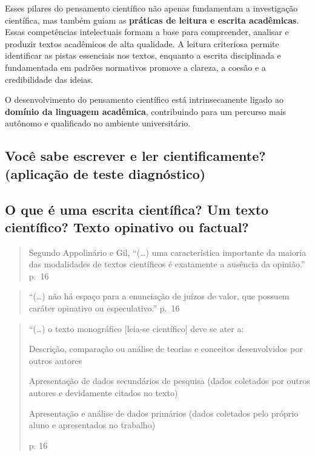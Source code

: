 \documentclass[
  letterpaper,
  DIV=11,
  numbers=noendperiod]{scrreprt}
\begin{document}
Esses pilares do pensamento científico não apenas fundamentam a
investigação científica, mas também guiam as \textbf{práticas de leitura
e escrita acadêmicas}. Essas competências intelectuais formam a base
para compreender, analisar e produzir textos acadêmicos de alta
qualidade. A leitura criteriosa permite identificar as pistas essenciais
nos textos, enquanto a escrita disciplinada e fundamentada em padrões
normativos promove a clareza, a coesão e a credibilidade das ideias.

O desenvolvimento do pensamento científico está intrinsecamente ligado
ao \textbf{domínio da linguagem acadêmica}, contribuindo para um
percurso mais autônomo e qualificado no ambiente universitário.

\subsection{Você sabe escrever e ler cientificamente? (aplicação de
teste
diagnóstico)}\label{vocuxea-sabe-escrever-e-ler-cientificamente-aplicauxe7uxe3o-de-teste-diagnuxf3stico}

\subsection{O que é uma escrita científica? Um texto científico? Texto
opinativo ou
factual?}\label{o-que-uxe9-uma-escrita-cientuxedfica-um-texto-cientuxedfico-texto-opinativo-ou-factual}

\begin{quote}
Segundo Appolinário e Gil, ``(\ldots) uma característica importante da
maioria das modalidades de textos científicos é exatamente a ausência da
opinião.'' p.~16
\end{quote}

\begin{quote}
``(\ldots) não há espaço para a enunciação de juízos de valor, que
possuem caráter opinativo ou especulativo.'' p.~16
\end{quote}

\begin{quote}
``(\ldots) o texto monográfico {[}leia-se científico{]} deve se ater a:

Descrição, comparação ou análise de teorias e conceitos desenvolvidos
por outros autores

Apresentação de dados secundários de pesquisa (dados coletados por
outros autores e devidamente citados no texto)

Apresentação e análise de dados primários (dados coletados pelo próprio
aluno e apresentados no trabalho)

p. 16
\end{quote}
\end{document}
